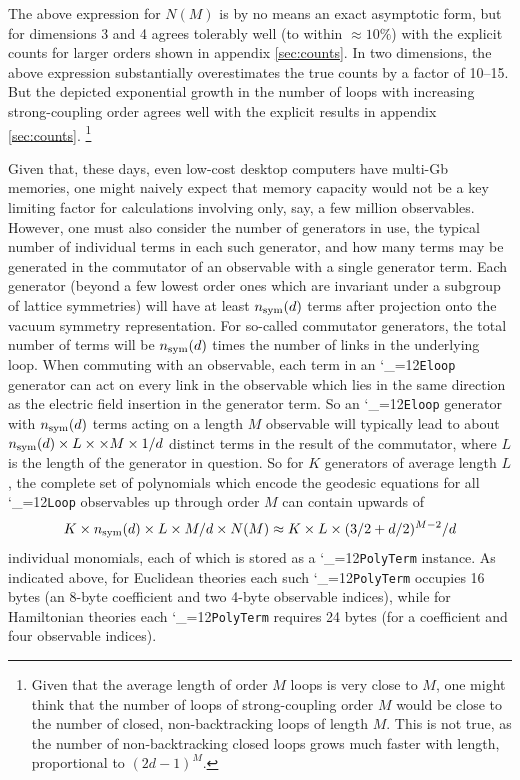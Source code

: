 \documentclass [12pt]{article}
\makeatletter
\renewcommand{\tt}{\begingroup\catcode`_=12\def\_{\string_}\tt@}
\newcommand{\tt@}[1]{\texttt{#1}\endgroup}
\makeatother
\begin{document}
The above expression for $N(M)$ is by no means an exact asymptotic form,
but for dimensions 3 and 4 agrees tolerably well (to within $\approx 10\%$) with
the explicit counts for larger orders shown in appendix \ref{sec:counts}.
In two dimensions, the above expression substantially overestimates
the true counts by a factor of 10--15.
But the depicted exponential growth in the number of loops with increasing
strong-coupling order agrees well with the explicit results in
appendix \ref{sec:counts}.%
\footnote
    {%
    Given that the average length of order $M$ loops is very close to $M$,
    one might think that the number of loops of strong-coupling order $M$
    would be close to the number of closed, non-backtracking loops of length $M$.
    This is not true, as the number of non-backtracking closed loops 
    grows much faster with length, proportional to $(2d-1)^M$.
    }

Given that, these days, even low-cost desktop computers have multi-Gb memories,
one might naively expect that memory capacity would not be a key limiting
factor for calculations involving only, say, a few million observables.
However, one must also consider the number of generators in use,
the typical number of individual terms in each such generator, and how
many terms may be generated in the commutator of an observable with
a single generator term.
Each generator (beyond a few lowest order ones
which are invariant under a subgroup of lattice symmetries)
will have at least $n_{\rm sym}(d)$
terms after projection onto the
vacuum symmetry representation.
For so-called commutator generators, the total number of terms
will be $n_{\rm sym}(d)$ times the number of links in the underlying loop.
When commuting with an observable,
each term in an \tt{Eloop} generator can act on every link
in the observable which lies in the same direction as the
electric field insertion in the generator term.
So an \tt{Eloop} generator with $n_{\rm sym}(d)$ terms
acting on a length $M$ observable will typically lead to about
$
    n_{\rm sym}(d) \times L \times \times M \times 1/d
$
distinct terms in the result of the commutator,
where $L$ is the length of the generator in question.
So for $K$ generators of average length $L$,
the complete set of polynomials which encode
the geodesic equations for all \tt{Loop} observables
up through order $M$ can contain upwards of
\begin{equation}
    K \times n_{\rm sym}(d) \times L \times M/d \times N(M)
    \approx
    K \times L \times (3/2+d/2)^{M-2} /d
\end{equation}
individual monomials, each of which is stored as a
\tt{PolyTerm} instance.
As indicated above, for Euclidean theories
each such \tt{PolyTerm} occupies 16 bytes
(an 8-byte coefficient and two 4-byte observable indices),
while for Hamiltonian theories each \tt{PolyTerm}
requires 24 bytes (for a coefficient and four observable indices).
\end{document}
